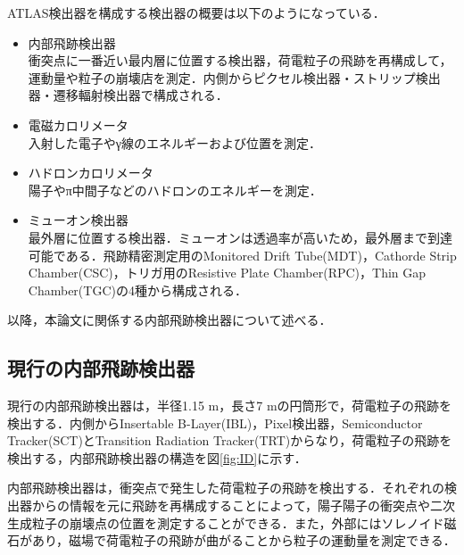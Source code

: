 ATLAS検出器を構成する検出器の概要は以下のようになっている．\par
\begin{itemize}
\item 内部飛跡検出器\\
衝突点に一番近い最内層に位置する検出器，荷電粒子の飛跡を再構成して，運動量や粒子の崩壊店を測定．内側からピクセル検出器・ストリップ検出器・遷移輻射検出器で構成される．
\item 電磁カロリメータ\\
入射した電子やγ線のエネルギーおよび位置を測定．
\item ハドロンカロリメータ\\
陽子やπ中間子などのハドロンのエネルギーを測定．
\item ミューオン検出器\\
最外層に位置する検出器．ミューオンは透過率が高いため，最外層まで到達可能である．飛跡精密測定用のMonitored Drift Tube(MDT)，Cathorde Strip Chamber(CSC)，トリガ用のResistive Plate Chamber(RPC)，Thin Gap Chamber(TGC)の4種から構成される．
\end{itemize}
以降，本論文に関係する内部飛跡検出器について述べる．\par

\subsection{現行の内部飛跡検出器}
現行の内部飛跡検出器は，半径1.15 $\mathrm{m}$，長さ7 $\mathrm{m}$の円筒形で，荷電粒子の飛跡を検出する．内側からInsertable B-Layer(IBL)，Pixel検出器，Semiconductor Tracker(SCT)とTransition Radiation Tracker(TRT)からなり，荷電粒子の飛跡を検出する，内部飛跡検出器の構造を図\ref{fig:ID}に示す．\par
内部飛跡検出器は，衝突点で発生した荷電粒子の飛跡を検出する．それぞれの検出器からの情報を元に飛跡を再構成することによって，陽子陽子の衝突点や二次生成粒子の崩壊点の位置を測定することができる．また，外部にはソレノイド磁石があり，磁場で荷電粒子の飛跡が曲がることから粒子の運動量を測定できる．\par



